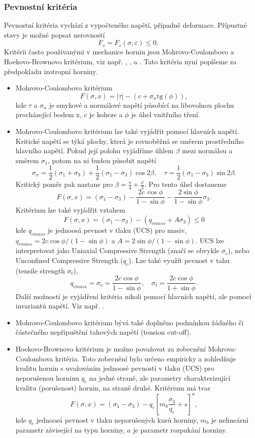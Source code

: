 \documentclass{article}
\begin{document}
\subsubsection{Pevnostní kritéria}
Pevnostní kritéria vychází z vypočteného napětí, případně deformace. Přípustné stavy je možné popsat nerovností
$$
	F_s = F_s(\sigma, \varepsilon) \leq 0.
$$
Kritérii často používanými v mechanice hornin jsou Mohrovo-Coulombovo a  Hoekovo-Brownovo  kritérium, viz např. 
\cite{Desai1984}, \cite{Goel2011}, \cite{Zang2010} a \cite{Brady2006}. Tato kritéria nyní popíšeme za předpokladu izotropní horniny.
\begin{itemize}
	\item Mohrovo-Coulombovo kritérium
		$$
			F (\sigma, x) = |\tau| - (c + \sigma_n \mbox{tg} (\phi)) ,
		$$
		kde $\tau$ a $\sigma_n$ je smykové a normálové napětí působící na libovolnou plochu procházející bodem x, $c$ je koheze a $\phi$ je úhel vnitřního tření.
	\item Mohrovo-Coulombovo kritérium lze také vyjádřit pomocí hlavních napětí. Kritické napětí se týká plochy, která je rovnoběžná se směrem prostředního hlavního napětí. Pokud její polohu vyjádříme úhlem $\beta$ mezi normálou a směrem $\sigma_1$, potom na ni budou působit napětí
		$$
			\sigma_n = \frac{1}{2}(\sigma_1 + \sigma_3 ) + \frac{1}{2}(\sigma_1 - \sigma_3 )\cos 2 \beta, \quad \tau = \frac{1}{2}(\sigma_1 - \sigma_3 ) \sin 2 \beta.
		$$
		Kritický poměr pak nastane pro $\beta =  \frac{\pi}{4} + \frac{\varphi}{2}$. Pro tento úhel dostaneme
		$$
			F(\sigma,x) = (\sigma_1 - \sigma_3 ) - \frac{2c\,\cos \phi}{1-\sin \phi} - \frac{2\sin \phi}{1-\sin \phi} \sigma_3 .
		$$
		Kritérium lze také vyjádřit vztahem
		$$
			F(\sigma, x) = (\sigma_1 - \sigma_3) - (q_{cmass} + A\sigma_3) \leq 0
		$$
		kde $q_{cmass}$ je jednoosá pevnost v tlaku (UCS) pro masiv, $q_{cmass} = 2c \cos \phi / (1-\sin \phi)$ a $A = 2 \sin \phi / (1-\sin \phi)$. UCS lze interpretovat jako Uniaxial Compressive Strength (značí se obvykle $\sigma_c$), nebo Unconfined Compressive Strength ($q_c$). Lze také využít pevnost v tahu (tensile strength $\sigma_t$),
		$$
			q_{cmass} = \sigma_c = \frac{2c \cos \phi}{1-\sin \phi}, \quad \sigma_t = \frac{2c \cos \phi}{1+ \sin \phi}.
		$$
		Další možností je vyjádření kritéria nikoli pomocí hlavních napětí, ale pomocí invariantů napětí. Viz např. \cite{Desai1984}.
	\item Mohrovo-Coulombovo kritérium bývá také doplněno podmínkou žádného či částečného nepřipuštění tahových napětí (tension cut-off).
	\item Hoekovo-Brownovo kritérium je možno považovat za zobecnění Mohrova-Coulombova kritéria. Toto zobecnění bylo určeno empiricky a zohledňuje kvalitu hornin s 						uvažováním jednoosé pevnosti v tlaku (UCS) pro neporušenou horninu $q_c$ na jedné straně, ale parametry charakterizující kvalitu (porušenost) hornin, na straně druhé. 					Kritérium má tvar
		$$
			F(\sigma,x)=(\sigma_1 - \sigma_3 ) - q_c \left[m_b \frac{\sigma_3}{q_c} + s \right]^a ,
		$$
		kde $q_{c}$ jednoosá pevnost v tlaku neporušených kusů horniny, $m_b$ je nelineární parametr závisející na typu horniny, $a$ je parametr rozpukání horniny.
\end{itemize}
\end{document}
